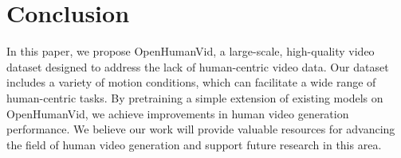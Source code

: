 
\section{Conclusion}

In this paper, we propose OpenHumanVid, a large-scale, high-quality video dataset designed to address the lack of human-centric video data. Our dataset includes a variety of motion conditions, which can facilitate a wide range of human-centric tasks. By pretraining a simple extension of existing models on OpenHumanVid, we achieve improvements in human video generation performance. We believe our work will provide valuable resources for advancing the field of human video generation and support future research in this area.

\vspace{+2mm}